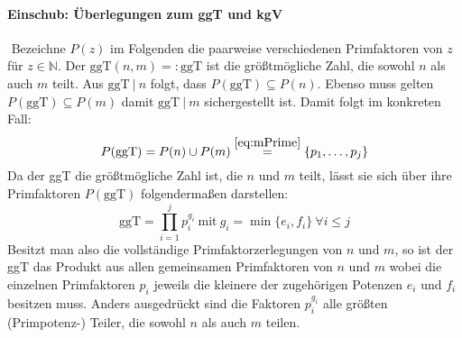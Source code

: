 \documentclass[DIN, pagenumber=false, fontsize=11pt, parskip=half]{scrartcl}
\newcommand{\N}[0]{\mathbb{N}}
\newcommand{\ggt}{\text{ggT}}
\begin{document}
\begin{enumerate}[label=\alph*)]
        \paragraph{Einschub: Überlegungen zum ggT und kgV} \label{par:Einschub} $ $ \newline
        Bezeichne $P(z)$ im Folgenden die paarweise verschiedenen Primfaktoren von $z$ für $z \in \N$. Der $\ggt(n,m) =: \ggt$ ist die größtmögliche Zahl, 
        die sowohl $n$ als auch $m$ teilt. Aus $\ggt \ | \ n$ folgt, dass $P(\ggt) \subseteq P(n)$. Ebenso muss gelten $P(\ggt) \subseteq P(m)$ damit 
        $\ggt \ | \ m$ sichergestellt ist. Damit folgt im konkreten Fall:
        \begin{equation}
            P(\ggt) = P(n) \cup P(m) \stackrel{\ref{eq:mPrime}}{=} \{p_1, \dots, p_j\} \label{eq:PggT}
        \end{equation}
        Da der ggT die größtmögliche Zahl ist, die $n$ und $m$ teilt, lässt sie sich über ihre Primfaktoren $P(\ggt)$ folgendermaßen darstellen:
        \begin{equation}
            \ggt = \prod_{i=1}^j{p_i^{g_i}} \ \text{mit} \ g_i = \min\{e_i, f_i\} \ \forall i \leq j \label{eq:ggt}
        \end{equation}
        Besitzt man also die vollständige Primfaktorzerlegungen von $n$ und $m$, so ist der ggT das Produkt aus allen gemeinsamen Primfaktoren von $n$ und $m$
        wobei die einzelnen Primfaktoren $p_i$ jeweils die kleinere der zugehörigen Potenzen $e_i$ und $f_i$ besitzen muss. Anders ausgedrückt sind die Faktoren
        $p_i^{g_i}$ alle größten (Primpotenz-) Teiler, die sowohl $n$ als auch $m$ teilen. \newpage


\end{enumerate}
\end{document}
